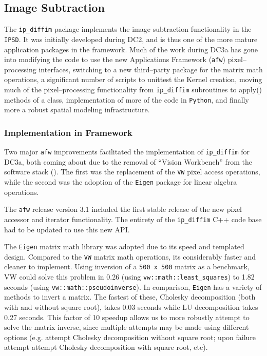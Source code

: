 
\subsection{Image Subtraction}

The {\tt ip\_diffim} package implements the image subtraction
functionality in the {\tt IPSD}.  It was initially developed during
DC2, and is thus one of the more mature application packages in the
framework.  Much of the work during DC3a has gone into modifying the
code to use the new Applications Framework ({\tt afw})
pixel--processing interfaces, switching to a new third--party package
for the matrix math operations, a significant number of scripts to
unittest the Kernel creation, moving much of the pixel--processing
functionality from {\tt ip\_diffim} subroutines to apply() methods of
a class, implementation of more of the code in {\tt Python}, and
finally more a robust spatial modeling infrastructure.

\subsubsection{Implementation in Framework}

Two major {\tt afw} improvements facilitated the implementation of
{\tt ip\_diffim} for DC3a, both coming about due to the removal of
``Vision Workbench'' from the software stack ().  The first was the
replacement of the {\tt VW} pixel access operations, while the second
was the adoption of the {\tt Eigen} package for linear algebra
operations.  

The {\tt afw} release version 3.1 included the first stable release of
the new pixel accessor and iterator functionality.  The entirety of
the {\tt ip\_diffim} C++ code base had to be updated to use this new
API.

The {\tt Eigen} matrix math library was adopted due to its speed and
templated design.  Compared to the {\tt VW} matrix math operations,
its considerably faster and cleaner to implement.  Using inversion of
a {\tt 500 x 500} matrix as a benchmark, VW could solve this problem
in 0.26 (using {\tt vw::math::least\_squares}) to 1.82 seconds (using
{\tt vw::math::pseudoinverse}).  In comparison, {\tt Eigen} has a
variety of methods to invert a matrix.  The fastest of these, Cholesky
decomposition (both with and without square root), takes 0.03 seconds
while LU decomposition takes 0.27 seconds.  This factor of 10 speedup
allows us to more robustly attempt to solve the matrix inverse, since
multiple attempts may be made using different options (e.g. attempt
Cholesky decomposition without square root; upon failure attempt
attempt Cholesky decomposition with square root, etc).


